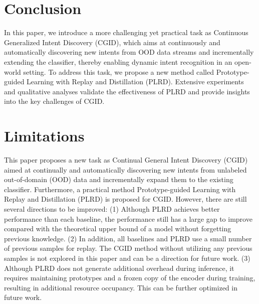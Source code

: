 \documentclass[11pt]{article}
\begin{document}
\section{Conclusion}
In this paper, we introduce a more challenging yet practical task as Continuous Generalized Intent Discovery (CGID), which aims at continuously and automatically discovering new intents from OOD data streams and incrementally extending the classifier, thereby enabling dynamic intent recognition in an open-world setting. To address this task, we propose a new method called Prototype-guided Learning with Replay and Distillation (PLRD). Extensive experiments and qualitative analyses validate the effectiveness of PLRD and provide insights into the key challenges of CGID.

\section*{Limitations}
This paper proposes a new task as Continual General Intent Discovery (CGID) aimed at continually and automatically discovering new intents from unlabeled out-of-domain (OOD) data  and incrementally expand them to the existing classifier. Furthermore, a practical method Prototype-guided Learning with Replay and Distillation (PLRD) is proposed for CGID. However, there are still several directions to be improved: (1) Although PLRD achieves better performance than each baseline, the performance still has a large gap to improve compared with the theoretical upper bound of a model without forgetting previous knowledge.  (2) In addition, all baselines and PLRD use a small number of previous samples for replay. The CGID method without utilizing any previous samples is not explored in this paper and can be a direction for future work. (3) Although PLRD does not generate additional overhead during inference, it requires maintaining prototypes and a frozen copy of the encoder during training, resulting in additional resource occupancy. This can be further optimized in future work.







\end{document}
